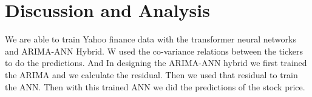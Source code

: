 \chapter{Discussion and Analysis}
\label{ch:evaluation}

We are able to train Yahoo finance data with the transformer neural networks and ARIMA-ANN Hybrid. W used the co-variance relations between the tickers to do the predictions. And In designing the ARIMA-ANN hybrid we first trained the ARIMA and we calculate the residual. Then we used that residual to train the ANN. Then with this trained  ANN we did the predictions of the stock price. 
